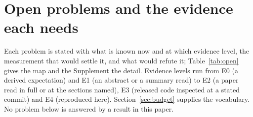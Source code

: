 \section{Open problems and the evidence each needs}
\label{sec:open}

Each problem is stated with what is known now and at which evidence level, the measurement that would settle it, and what would refute it; Table~\ref{tab:open} gives the map and the Supplement the detail. Evidence levels run from E0 (a derived expectation) and E1 (an abstract or a summary read) to E2 (a paper read in full or at the sections named), E3 (released code inspected at a stated commit) and E4 (reproduced here). Section~\ref{sec:budget} supplies the vocabulary. No problem below is answered by a result in this paper. %

